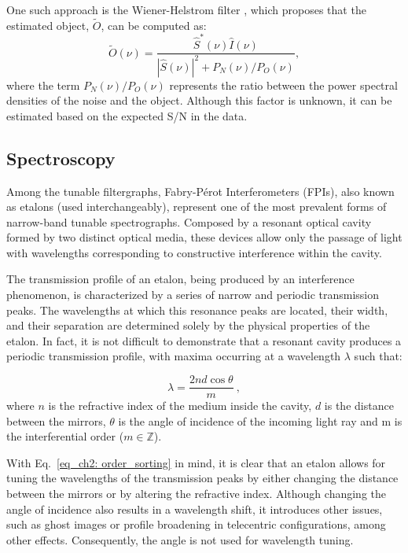 One such approach is the Wiener-Helstrom filter \citep{wiener-helstorm}, which proposes that the estimated object, $\tilde{O}$, can be computed as:
\begin{equation}
  \tilde{O}(\nu) =  \frac{\hat{S}^{*}(\nu) \hat{I}(\nu)}{| \hat{S}(\nu)| ^2 + P_N (\nu) / P_O (\nu)},
  \label{eq_imaging: Wiener-Helstorm}
\end{equation} 
where the term $P_N(\nu) / P_O(\nu)$ represents the ratio between the power spectral densities of the noise and the object. Although this factor is unknown, it can be estimated based on the expected S/N in the data.

\subsection{Spectroscopy}

Among the tunable filtergraphs, Fabry-Pérot Interferometers (FPIs), also known as etalons (used interchangeably), represent one of the most prevalent forms of narrow-band tunable spectrographs. Composed by a resonant optical cavity formed by two distinct optical media, these devices allow only the passage of light with wavelengths corresponding to constructive interference within the cavity. 

The transmission profile of an etalon, being produced by an interference phenomenon, is characterized by a series of narrow and periodic transmission peaks. The wavelengths at which this resonance peaks are located, their width, and their separation are determined solely by the physical properties of the etalon. In fact, it is not difficult to demonstrate \citep{franI} that a resonant cavity produces a periodic transmission profile, with maxima occurring at a wavelength $\lambda$ such that:

\begin{equation}
\lambda = \frac{2nd\cos \theta}{m}\ ,
\label{eq_ch2: order_sorting}
\end{equation}
where $n$ is the refractive index of the medium inside the cavity, $d$ is the distance between the mirrors, $\theta$ is the angle of incidence of the incoming light ray and m is the interferential order ($m \in \mathbb{Z} $). 

With Eq.~\eqref{eq_ch2: order_sorting} in mind, it is clear that an etalon allows for tuning the wavelengths of the transmission peaks by either changing the distance between the mirrors or by altering the refractive index. Although changing the angle of incidence also results in a wavelength shift, it introduces other issues, such as ghost images or profile broadening in telecentric configurations, among other effects. Consequently, the angle is not used for wavelength tuning.

